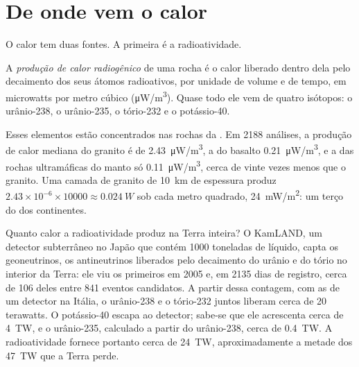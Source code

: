 \section{De onde vem o calor}

O calor tem duas fontes. A primeira é a radioatividade.

\begin{definition}\label{def:g12:internal-heat:heat-production}
A \emph{produção de calor radiogênico} de
uma rocha é o calor liberado dentro dela pelo decaimento dos seus átomos
radioativos, por unidade de volume e de tempo, em microwatts por metro
cúbico (\unit{\micro W/m^3}). Quase todo ele vem de quatro isótopos: o
urânio-238, o urânio-235, o tório-232 e o potássio-40.
\end{definition}

Esses elementos estão concentrados nas rochas da . Em
2188 análises, a produção de calor mediana do granito é de
\qty{2.43}{\micro W/m^3}, a do basalto \qty{0.21}{\micro W/m^3}, e a das
rochas ultramáficas do manto só \qty{0.11}{\micro W/m^3}, cerca de vinte
vezes menos que o granito. Uma camada de granito de \qty{10}{km} de
espessura produz
$2.43 \times 10^{-6} \times \num{10000} \approx \qty{0.024}{W}$ sob cada
metro quadrado, \qty{24}{mW/m^2}: um terço do  dos
continentes.

Quanto calor a radioatividade produz na Terra inteira? O KamLAND, um
detector subterrâneo no Japão que contém 1000 toneladas de líquido, capta os
geoneutrinos, os antineutrinos liberados pelo decaimento do urânio e do
tório no interior da Terra: ele viu os primeiros em 2005 e, em 2135 dias de
registro, cerca de 106 deles entre 841 eventos candidatos. A partir dessa
contagem, com as de um detector na Itália, o urânio-238 e o tório-232 juntos
liberam cerca de 20 terawatts. O potássio-40 escapa ao detector; sabe-se que
ele acrescenta cerca de \qty{4}{TW}, e o urânio-235, calculado a partir do
urânio-238, cerca de \qty{0.4}{TW}. A radioatividade fornece portanto cerca
de \qty{24}{TW}, aproximadamente a metade dos \qty{47}{TW} que a Terra
perde.


